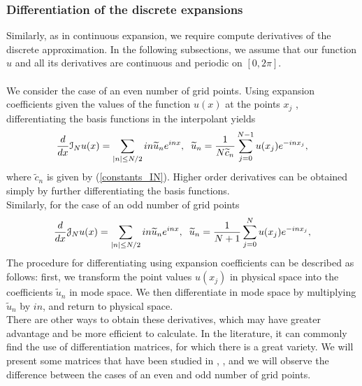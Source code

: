    \subsubsection{Differentiation of the discrete expansions}
    
    Similarly, as in continuous expansion, we require compute derivatives of the discrete approximation. In the following subsections, we assume that our function $u$ and all its derivatives are continuous and periodic on $[0, 2\pi]$.\\
    \\
    We consider the case of an even number of grid points. Using expansion coefficients given the values of the function $u(x)$ at the points $x_j$ , differentiating the basis functions in the interpolant yields
    \begin{align}
        \frac{d}{dx} \mathcal{I}_N u(x) = \displaystyle \sum_{|n| \leq N/2} in \widetilde{u}_n e^{inx}, \hspace{2mm} \widetilde{u}_n = \displaystyle \frac{1}{N \widetilde{c}_n} \sum_{j=0}^{N-1} u(x_j) e^{-in x_j},   
    \end{align}
    where $\widetilde{c}_n$ is given by (\ref{constants_IN}). Higher order derivatives can be obtained simply by further differentiating the basis functions.\\
    
    \noindent Similarly, for the case of an odd number of grid points
    \begin{align}
    	\frac{d}{dx} \mathcal{J}_N u(x) = \displaystyle \sum_{|n| \leq N/2} in \widetilde{u}_n e^{inx}, \hspace{2mm} \widetilde{u}_n = \displaystyle \frac{1}{N + 1} \sum_{j=0}^{N} u(x_j) e^{-in x_j},   
    \end{align} 
    The procedure for differentiating using expansion coefficients can be described as follows: first, we transform the point values $u(x_j)$ in physical space into the coefficients $\widetilde{u}_n$ in mode space. We then differentiate in mode space by multiplying  $\widetilde{u}_n$ by $in$, and return to physical space.\\
    
    There are other ways to obtain these derivatives, which may have greater advantage and be more efficient to calculate. In the literature, it can commonly find the use of differentiation matrices, for which there is a great variety. We will present some matrices that have been studied in \cite{gottlieb2007}, \cite{Canuto2012}, and we will observe the difference between the cases of an even and odd number of grid points. \\
    
